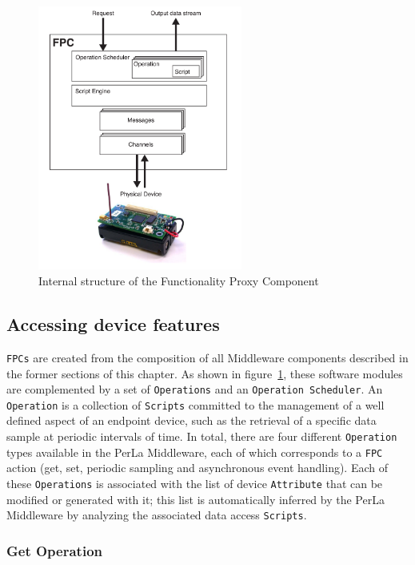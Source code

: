 \begin{figure}[h!]
\center
\includegraphics[width=0.6\textwidth]{imgs/fpc.pdf}
\caption{Internal structure of the Functionality Proxy Component}
\label{fig:fpc}
\end{figure}

\subsection{Accessing device features}
\label{sec:operations}

\texttt{FPCs} are created from the composition of all Middleware components
described in the former sections of this chapter. As shown in
figure~\ref{fig:fpc}, these software modules are complemented by a set of
\texttt{Operations} and an \texttt{Operation Scheduler}. An \texttt{Operation}
is a collection of \texttt{Scripts} committed to the management of a well
defined aspect of an endpoint device, such as the retrieval of a specific data
sample at periodic intervals of time. In total, there are four different
\texttt{Operation} types available in the PerLa Middleware, each of which
corresponds to a \texttt{FPC} action (get, set, periodic sampling and
asynchronous event handling). Each of these \texttt{Operations} is associated
with the list of device \texttt{Attribute} that can be modified or generated
with it; this list is automatically inferred by the PerLa Middleware by
analyzing the associated data access \texttt{Scripts}.

\subsubsection{Get Operation}

